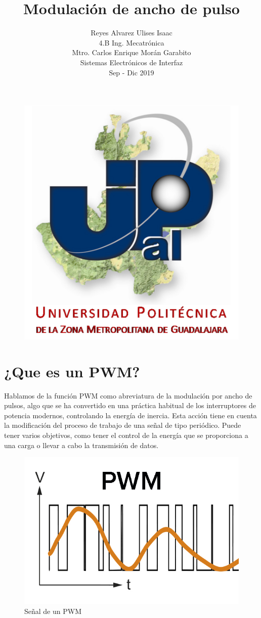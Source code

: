 \documentclass[12pt,a4paper]{article}
\author{Reyes Alvarez Ulises Isaac\\4.B Ing. Mecatrónica\\Mtro. Carlos Enrique Morán Garabito\\Sistemas Electrónicos de Interfaz\\Sep - Dic 2019\\}
\title{Modulación de ancho de pulso}
\begin{document}
\maketitle
\begin{figure}[hbtp]
\centering
\includegraphics[scale=1.75]{Pictures/Universidad.png}
\end{figure}

\newpage
\section{¿Que es un PWM?}
Hablamos de la función PWM como abreviatura de la modulación por ancho de pulsos, algo que se ha convertido en una práctica habitual de los interruptores de potencia modernos, controlando la energía de inercia. Esta acción tiene en cuenta la modificación del proceso de trabajo de una señal de tipo periódico. Puede tener varios objetivos, como tener el control de la energía que se proporciona a una carga o llevar a cabo la transmisión de datos.
\begin{figure}[hbtp]
\centering
\includegraphics[scale=0.3]{Pictures/quees.jpg}
\caption{Señal de un PWM}
\end{figure}
\end{document}
